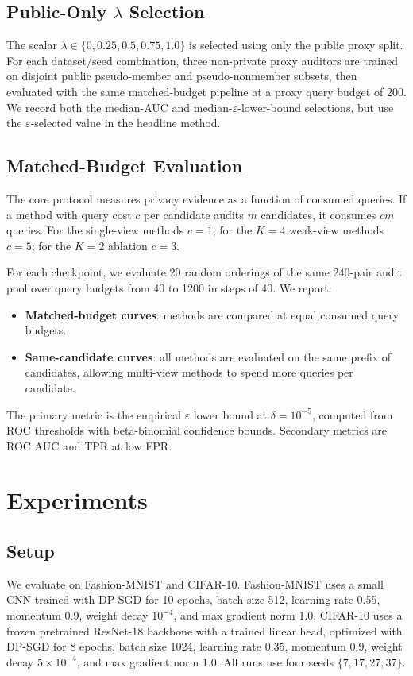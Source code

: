 \documentclass{article}
\newcommand{\eps}{\varepsilon}
\newcommand{\del}{\delta}
\newcommand{\lambdasection}{\texorpdfstring{\(\lambda\)}{lambda}}
\begin{document}
\subsection{Public-Only \lambdasection{} Selection}
The scalar \(\lambda \in \{0, 0.25, 0.5, 0.75, 1.0\}\) is selected using only the public proxy split. For each dataset/seed combination, three non-private proxy auditors are trained on disjoint public pseudo-member and pseudo-nonmember subsets, then evaluated with the same matched-budget pipeline at a proxy query budget of 200. We record both the median-AUC and median-\(\eps\)-lower-bound selections, but use the \(\eps\)-selected value in the headline method.

\subsection{Matched-Budget Evaluation}
The core protocol measures privacy evidence as a function of consumed queries. If a method with query cost \(c\) per candidate audits \(m\) candidates, it consumes \(cm\) queries. For the single-view methods \(c=1\); for the \(K=4\) weak-view methods \(c=5\); for the \(K=2\) ablation \(c=3\).

For each checkpoint, we evaluate 20 random orderings of the same 240-pair audit pool over query budgets from 40 to 1200 in steps of 40. We report:
\begin{itemize}[leftmargin=*,topsep=2pt,itemsep=2pt]
    \item \textbf{Matched-budget curves}: methods are compared at equal consumed query budgets.
    \item \textbf{Same-candidate curves}: all methods are evaluated on the same prefix of candidates, allowing multi-view methods to spend more queries per candidate.
\end{itemize}

The primary metric is the empirical \(\eps\) lower bound at \(\del=10^{-5}\), computed from ROC thresholds with beta-binomial confidence bounds. Secondary metrics are ROC AUC and TPR at low FPR.

\section{Experiments}
\label{sec:experiments}

\subsection{Setup}
We evaluate on Fashion-MNIST and CIFAR-10. Fashion-MNIST uses a small CNN trained with DP-SGD for 10 epochs, batch size 512, learning rate 0.55, momentum 0.9, weight decay \(10^{-4}\), and max gradient norm 1.0. CIFAR-10 uses a frozen pretrained ResNet-18 backbone with a trained linear head, optimized with DP-SGD for 8 epochs, batch size 1024, learning rate 0.35, momentum 0.9, weight decay \(5\times 10^{-4}\), and max gradient norm 1.0. All runs use four seeds \(\{7,17,27,37\}\).
\end{document}
